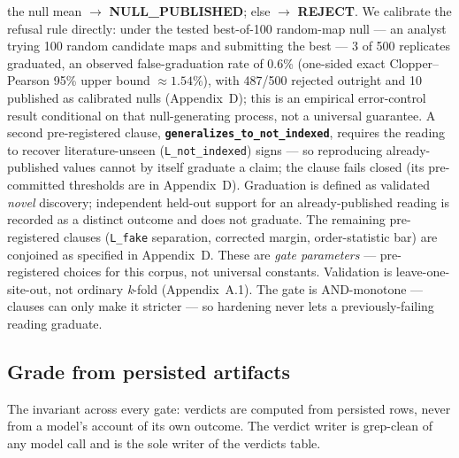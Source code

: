 the null mean $\rightarrow$ \textbf{NULL\_PUBLISHED}; else $\rightarrow$
\textbf{REJECT}.
We calibrate the refusal rule directly: under the
tested best-of-100 random-map null --- an analyst trying 100 random
candidate maps and submitting the best --- 3 of 500 replicates graduated,
an observed false-graduation rate of 0.6\% (one-sided exact
Clopper--Pearson 95\% upper bound $\approx 1.54\%$), with 487/500 rejected
outright and 10 published as calibrated nulls (Appendix~D); this is an
empirical
error-control result conditional on that null-generating process, not a
universal guarantee. A second
pre-registered clause, \textbf{\texttt{generalizes\_to\_not\_indexed}},
requires the reading to recover literature-unseen (\texttt{L\_not\_indexed})
signs --- so reproducing already-published values cannot by itself
graduate a claim; the clause fails closed (its pre-committed thresholds
are in Appendix~D). Graduation is defined as validated \emph{novel}
discovery; independent held-out support for an already-published reading
is recorded as a distinct outcome and does not graduate. The remaining
pre-registered clauses (\texttt{L\_fake} separation, corrected margin,
order-statistic bar) are conjoined as specified in Appendix~D. These are
\emph{gate parameters} --- pre-registered
choices for this corpus, not universal constants. Validation is
leave-one-site-out, not ordinary \emph{k}-fold (Appendix~A.1). The gate is
AND-monotone --- clauses can only make it stricter --- so hardening never
lets a previously-failing reading graduate.

\subsection{Grade from persisted artifacts}

The invariant across every gate: verdicts are computed from persisted
rows, never from a model's account of its own outcome. The verdict writer
is grep-clean of any model call and is the sole writer of the verdicts
table.

